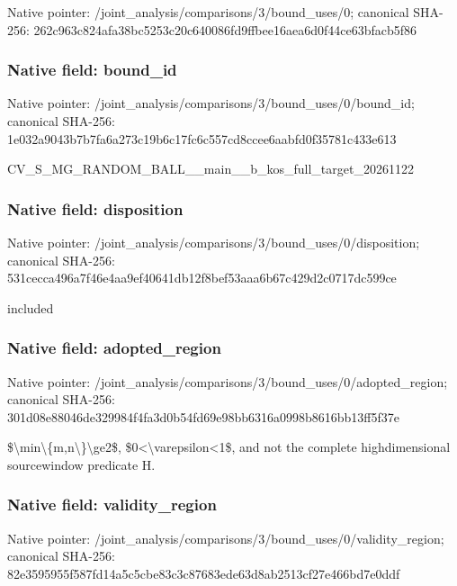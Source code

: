 \documentclass[10pt,a4paper]{article}
\begin{document}
Native pointer: /joint\_analysis/comparis\allowbreak{}ons/3/bound\_uses/0; canonical SHA-256: 262c963c824afa38bc5253c2\allowbreak{}0c640086fd9ffbee16aea6d0\allowbreak{}f44ce63bfacb5f86



\subsubsection{Native field: bound\_id}


Native pointer: /joint\_analysis/comparis\allowbreak{}ons/3/bound\_uses/0/bound\allowbreak{}\_id; canonical SHA-256: 1e032a9043b7b7fa6a273c19\allowbreak{}b6c17fc6c557cd8ccee6aabf\allowbreak{}d0f35781c433e613


CV\_S\_MG\_RANDOM\_BALL\_\_mai\allowbreak{}n\_\_b\_kos\_full\_target\_202\allowbreak{}61122


\subsubsection{Native field: disposition}


Native pointer: /joint\_analysis/comparis\allowbreak{}ons/3/bound\_uses/0/dispo\allowbreak{}sition; canonical SHA-256: 531cecca496a7f46e4aa9ef4\allowbreak{}0641db12f8bef53aaa6b67c4\allowbreak{}29d2c0717dc599ce


included


\subsubsection{Native field: adopted\_region}


Native pointer: /joint\_analysis/comparis\allowbreak{}ons/3/bound\_uses/0/adopt\allowbreak{}ed\_region; canonical SHA-256: 301d08e88046de329984f4fa\allowbreak{}3d0b54fd69e98bb6316a0998\allowbreak{}b8616bb13ff5f37e


\$\textbackslash{}min\textbackslash{}\{m,n\textbackslash{}\}\textbackslash{}ge2\$, \$0<\textbackslash{}varepsilon<1\$, and not the complete highdimensional sourcewindow predicate H.


\subsubsection{Native field: validity\_region}


Native pointer: /joint\_analysis/comparis\allowbreak{}ons/3/bound\_uses/0/valid\allowbreak{}ity\_region; canonical SHA-256: 82e3595955f587fd14a5c5cb\allowbreak{}e83c3c87683ede63d8ab2513\allowbreak{}cf27e466bd7e0ddf
\end{document}
